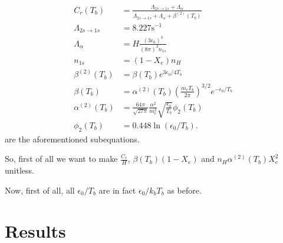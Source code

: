 \documentclass[12pt]{article}
\begin{document}
\begin{align*}\label{eq: peebles components again}
        C_{r}\left(T_{b}\right) &=\frac{\Lambda_{2 s \rightarrow 1 s}+\Lambda_{\alpha}}{\Lambda_{2 s \rightarrow 1 s}+\Lambda_{\alpha}+\beta^{(2)}\left(T_{b}\right)} \\
        \Lambda_{2 s \rightarrow 1 s} &=8.227 \mathrm{s}^{-1} \\
        \Lambda_{\alpha} &=H \frac{\left(3 \epsilon_{0}\right)^{3}}{(8 \pi)^{2} n_{1 s}} \\
        n_{1 s} &=\left(1-X_{e}\right) n_{H} \\
        \beta^{(2)}\left(T_{b}\right) &=\beta\left(T_{b}\right) e^{3 \epsilon_{0} / 4 T_{b}} \\
        \beta\left(T_{b}\right) &=\alpha^{(2)}\left(T_{b}\right)\left(\frac{m_{e} T_{b}}{2 \pi}\right)^{3 / 2} e^{-\epsilon_{0} / T_{b}} \\
        \alpha^{(2)}\left(T_{b}\right) &=\frac{64 \pi}{\sqrt{27 \pi}} \frac{\alpha^{2}}{m_{e}^{2}} \sqrt{\frac{\epsilon_{0}}{T_{b}}} \phi_{2}\left(T_{b}\right) \\
        \phi_{2}\left(T_{b}\right) &=0.448 \ln \left(\epsilon_{0} / T_{b}\right).
\end{align*}
are the aforementioned subequations.

So, first of all we want to make $\frac{C_r}{H}$, $\beta(T_b)(1-X_e)$ and $n_H\alpha^{(2)}(T_b)X_e^2$ unitless. 

Now, first of all, all $\epsilon_0/T_b$ are in fact $\epsilon_0/k_b T_b$ as before. 

\section{Results}

{}

\end{document}
